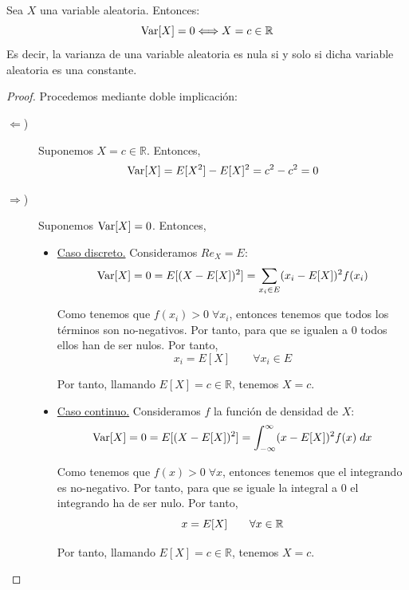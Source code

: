 \begin{prop}\label{prop:6.13}
    Sea $X$ una variable aleatoria. Entonces:
    \begin{equation*}
        \operatorname{Var}[X]=0 \Longleftrightarrow X=c\in \mathbb{R}
    \end{equation*}
    Es decir, la varianza de una variable aleatoria es nula si y solo si dicha variable aleatoria es una constante.
\end{prop}
\begin{proof}
    Procedemos mediante doble implicación:
    \begin{description}
        \item [$\Longleftarrow$)] Suponemos $X=c\in \mathbb{R}$. Entonces,
        \begin{equation*}
            \operatorname{Var}[X] = E[X^2]-E[X]^2 = c^2 -c^2 = 0
        \end{equation*}

        \item [$\Longrightarrow$)] Suponemos $\operatorname{Var}[X]=0$. Entonces,
        \begin{itemize}
            \item \underline{Caso discreto.} Consideramos $Re_X = E$:
            \begin{equation*}
                \operatorname{Var}[X] = 0 = E[(X-E[X])^2]
                = \sum_{x_i\in E}(x_i-E[X])^2 f(x_i)
            \end{equation*}

            Como tenemos que $f(x_i)> 0\;\forall x_i$, entonces tenemos que todos los términos son no-negativos. Por tanto, para que se igualen a $0$ todos ellos han de ser nulos. Por tanto,
            \begin{equation*}
                x_i = E[X] \qquad \forall x_i \in E
            \end{equation*}

            Por tanto, llamando $E[X]=c\in \mathbb{R}$, tenemos $X=c$.



            \item \underline{Caso continuo.} Consideramos $f$ la función de densidad de $X$:
            \begin{equation*}
                \operatorname{Var}[X] = 0 = E[(X-E[X])^2]
                = \int_{-\infty}^\infty (x-E[X])^2 f(x)\;dx
            \end{equation*}

            Como tenemos que $f(x)> 0\;\forall x$, entonces tenemos que el integrando es no-negativo. Por tanto, para que se iguale la integral a $0$ el integrando ha de ser nulo. Por tanto,
            \begin{equation*}
                x = E[X] \qquad \forall x \in \mathbb{R}
            \end{equation*}

            Por tanto, llamando $E[X]=c\in \mathbb{R}$, tenemos $X=c$.
        \end{itemize}
    \end{description}
\end{proof}

